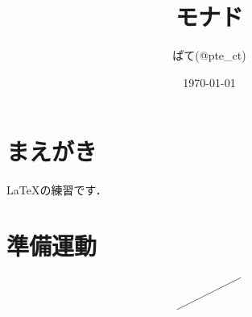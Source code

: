 \documentclass[11pt,a4paper]{jsarticle}
\title{モナド}
\author{ぱて(@pte\_ct)}
\date{\today}
\begin{document}
\maketitle
% 
%

\section{まえがき}
LaTeXの練習です．

\section{準備運動}
\[
\begin{tikzpicture}
\draw (0,0) --(2,1);
\end{tikzpicture}
\]




%
%
\end{document}
